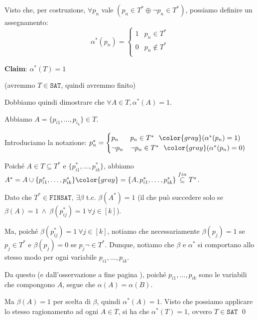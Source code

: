 \documentclass[a4paper,11pt]{report}
\begin{document}
Visto che, per costruzione, \( \forall p_n \) vale \( ( p_n \in T^* \oplus \neg p_n \in T^* )\), possiamo definire un assegnamento:
\[ \alpha^*(p_n) = \begin{cases}
    1 & p_n \in T^* \\
    0 & p_n \not\in T^* \\
\end{cases} \]

\begin{gbox}[colframe=DeepTeal, colback=DeepTealLight]{}
    \textbf{Claim}: \( \alpha^*(T) = 1 \)
    
    {\small\color{gray}(avremmo \( T\in \texttt{SAT} \), quindi avremmo finito)}
\end{gbox}

Dobbiamo quindi dimostrare che \( \forall A \in T, \alpha^*(A) = 1 \).

Abbiamo \( A = \{p_{i1}, \dots, p_{i_k} \}\in T\).

Introduciamo la notazione: \( p_n^* = \begin{cases}
    p_n & p_n \in T^* \  \ {\color{gray} (\alpha^*(p_n)=1)} \\
    \neg p_n & \neg p_n \in T^* \  \ {\color{gray} (\alpha^*(p_n)=0)} \\
\end{cases} \)

Poiché \( A\in T \subseteq T^* \) e \( \{p^*_{i1}, \dots, p^*_{ik}\} \), abbiamo \( A^* = A \cup \{p^*_{i1}, \dots, p^*_{ik}\} {\color{gray}= \{A, p^*_{i1}, \dots, p^*_{ik}\}} \overset{fin}{\subseteq } T^*\).

Dato che \( T^* \in \texttt{FINSAT}, \ \exists \beta \) t.c. \( \beta(A^*)=1 \) (il che può succedere solo se \( \beta(A) = 1 \ \land \ \beta(p^*_{ij}) = 1 \ \forall j \in [k] \)).

Ma, poiché \( \beta(p^*_{ij}) = 1 \ \forall j \in [k]  \), notiamo che necessariamente \( \beta(p_j) = 1  \) se \( p_j \in T^* \) e \( \beta(p_j) = 0  \) se \( p_j \neg\in T^* \). Dunque, notiamo che \( \beta \) e \( \alpha^* \) si comportano allo stesso modo per ogni variabile \( p_{i1}, \dots, p_{ik} \).

Da questo (e dall'osservazione a fine pagina \pageref{asseq}), poiché \( p_{i1}, \dots, p_{ik} \) sono le variabili che compongono \( A \), segue che \( \alpha(A) = \alpha(B) \).

Ma \( \beta(A) = 1 \) per scelta di \( \beta \), quindi \( \alpha^*(A) = 1 \). Visto che possiamo applicare lo stesso ragionamento ad ogni \( A \in T \), si ha che \( \alpha^*(T) = 1 \), ovvero \( T \in \texttt{SAT} \) \qed
\end{document}
